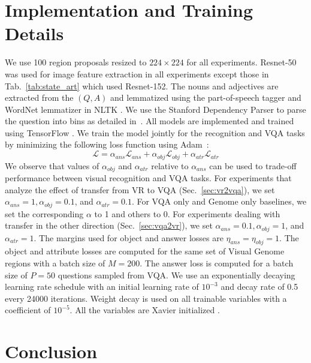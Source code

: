\documentclass[10pt,twocolumn,letterpaper]{article}
\begin{document}
\section{Implementation and Training Details}
We use 100 region proposals resized to $224 \times 224$ for all experiments. Resnet-50 was used for image feature extraction in all experiments except those in Tab.~\ref{tab:state_art} which used Resnet-152. The nouns and adjectives are extracted from the $(Q,A)$  and lemmatized using the part-of-speech tagger and WordNet lemmatizer in NLTK \cite{bird2009book}. We use the Stanford Dependency Parser \cite{de2006lrec} to parse the question into bins as detailed in~\cite{shih2016look}.  All models are implemented and trained using TensorFlow \cite{tensorflow2015software}. We train the model jointly for the recognition and VQA tasks by minimizing the following loss function using Adam~\cite{adamoptimizer}:
\begin{equation}
\mathcal{L} = \alpha_{ans}\mathcal{L}_{ans} + \alpha_{obj}\mathcal{L}_{obj} + \alpha_{atr}\mathcal{L}_{atr}
\end{equation}
We observe that values of $\alpha_{obj}$ and $\alpha_{atr}$ relative to $\alpha_{ans}$ can be used to trade-off performance between visual recognition and VQA tasks. For experiments that analyze the effect of transfer from VR to VQA (Sec.~\ref{sec:vr2vqa}), we set ${\alpha_{ans} = 1, \alpha_{obj} = 0.1}$, and ${\alpha_{atr}=0.1}$. For VQA only and Genome only baselines, we set the corresponding $\alpha$ to 1 and others to 0.  For experiments dealing with transfer in the other direction (Sec.~\ref{sec:vqa2vr}), we set ${\alpha_{ans} = 0.1, \alpha_{obj} = 1}$, and ${\alpha_{atr}=1}$.  The margins used for object and answer losses are $\eta_{ans}=\eta_{obj}=1$. The object and attribute losses are computed for the same set of Visual Genome regions with a batch size of $M=200$. The answer loss is computed for a batch size of $P=50$ questions sampled from VQA. We use an exponentially decaying learning rate schedule with an initial learning rate of $10^{-3}$ and decay rate of 0.5 every 24000 iterations. Weight decay is used on all trainable variables with a coefficient of $10^{-5}$. All the variables are Xavier initialized \cite{glorot2010aistats}.



\section{Conclusion}
\end{document}
